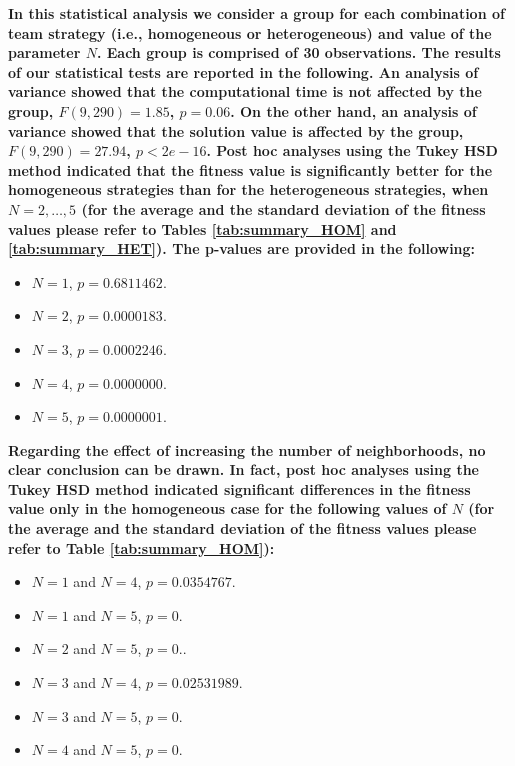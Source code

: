 \documentclass[journal]{IEEEtran}
\begin{document}
\textbf{In this statistical analysis we consider a group for each combination of team strategy (i.e., homogeneous or heterogeneous) and value of the parameter $N$. Each group is comprised of 30 observations. The results of our statistical tests are reported in the following. An analysis of variance showed that the computational time is not affected by the group, $F(9,290) = 1.85$, $p = 0.06$. On the other hand, an analysis of variance showed that the solution value is affected by the group, $F(9,290) = 27.94$, $p < 2e-16$.  Post hoc analyses using the Tukey HSD method indicated that the fitness value is significantly better for the homogeneous strategies than for the heterogeneous strategies, when $N = 2, \ldots, 5$ (for the average and the standard deviation of the fitness values please refer to Tables \ref{tab:summary_HOM} and \ref{tab:summary_HET}). The p-values are provided in the following:}

\begin{itemize}
\item $N=1$, $p = 0.6811462$.
\item $N=2$, $p = 0.0000183$.
\item $N=3$, $p = 0.0002246$.
\item $N=4$, $p = 0.0000000$.
\item $N=5$, $p = 0.0000001$.
\end{itemize}

\textbf{Regarding the effect of increasing the number of neighborhoods, no clear conclusion can be drawn. In fact, post hoc analyses using the Tukey HSD method indicated significant differences in the fitness value only in the homogeneous case for the following values of $N$ (for the average and the standard deviation of the fitness values please refer to Table \ref{tab:summary_HOM}):}

\begin{itemize}
\item $N=1$ and $N=4$, $p = 0.0354767$.
\item $N=1$ and $N=5$, $p = 0$.
\item $N=2$ and $N=5$, $p = 0.$.
\item $N=3$ and $N=4$, $p = 0.02531989$.
\item $N=3$ and $N=5$, $p = 0$.
\item $N=4$ and $N=5$, $p = 0$.
\end{itemize}
\end{document}
